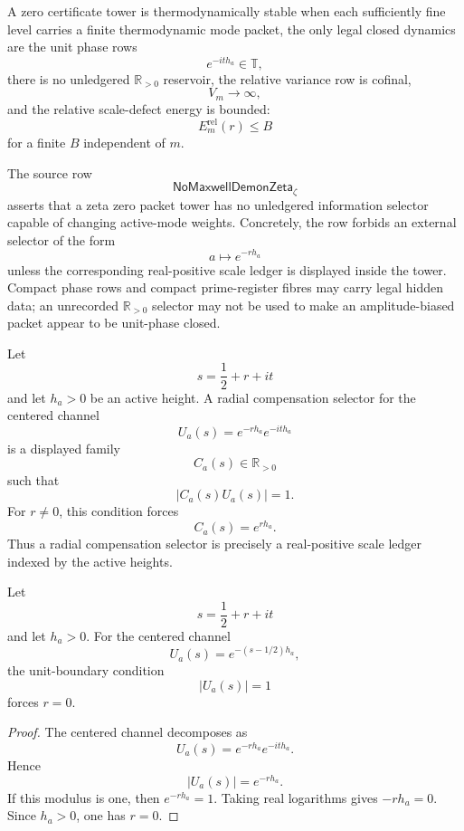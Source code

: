 \begin{definition}
\label{def:rh-thermodynamically-stable-zero-packet-tower}
A zero certificate tower is thermodynamically stable when each
sufficiently fine level carries a finite thermodynamic mode packet,
the only legal closed dynamics are the unit phase rows
$$
e^{-it h_a}\in\mathbb T,
$$
there is no unledgered $\mathbb R_{>0}$ reservoir, the relative
variance row is cofinal,
$$
V_m\to\infty,
$$
and the relative scale-defect energy is bounded:
$$
E_m^{\mathrm{rel}}(r)\le B
$$
for a finite $B$ independent of $m$.
\end{definition}

\begin{definition}
\label{def:rh-no-unledgered-selector-row}
The source row
$$
\mathsf{NoMaxwellDemonZeta}_{\zeta}
$$
asserts that a zeta zero packet tower has no unledgered information
selector capable of changing active-mode weights.  Concretely, the row
forbids an external selector of the form
$$
a\longmapsto e^{-r h_a}
$$
unless the corresponding real-positive scale ledger is displayed inside
the tower.  Compact phase rows and compact prime-register fibres may
carry legal hidden data; an unrecorded $\mathbb R_{>0}$ selector may not
be used to make an amplitude-biased packet appear to be unit-phase
closed.
\end{definition}

\begin{definition}
\label{def:rh-radial-compensation-selector}
Let
$$
s=\frac12+r+it
$$
and let $h_a>0$ be an active height.  A radial compensation selector for
the centered channel
$$
U_a(s)=e^{-r h_a}e^{-it h_a}
$$
is a displayed family
$$
C_a(s)\in\mathbb R_{>0}
$$
such that
$$
|C_a(s)U_a(s)|=1.
$$
For $r\neq0$, this condition forces
$$
C_a(s)=e^{r h_a}.
$$
Thus a radial compensation selector is precisely a real-positive scale
ledger indexed by the active heights.
\end{definition}

\begin{lemma}
\label{lem:rh-unit-boundary-local-channel-test}
Let
$$
s=\frac12+r+it
$$
and let $h_a>0$.  For the centered channel
$$
U_a(s)=e^{-(s-1/2)h_a},
$$
the unit-boundary condition
$$
|U_a(s)|=1
$$
forces $r=0$.
\end{lemma}

\begin{proof}
The centered channel decomposes as
$$
U_a(s)=e^{-r h_a}e^{-it h_a}.
$$
Hence
$$
|U_a(s)|=e^{-r h_a}.
$$
If this modulus is one, then $e^{-r h_a}=1$.  Taking real logarithms
gives $-r h_a=0$.  Since $h_a>0$, one has $r=0$.
\end{proof}

